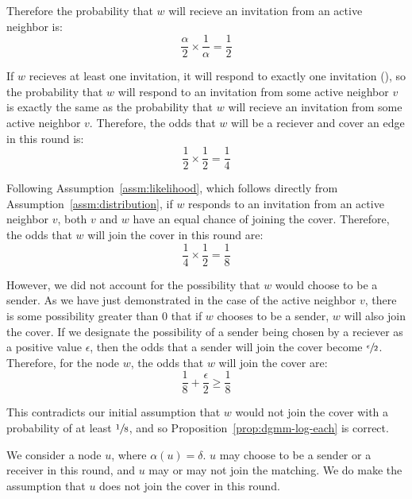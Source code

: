 \begin{IEEEproof}
\begin{IEEEproof}
Therefore the probability that $w$ will recieve an invitation from an active neighbor is: \begin{equation*}\frac{\alpha}{2} \times \frac{1}{\alpha} = \frac{1}{2}\end{equation*}

If $w$ recieves at least one invitation, it will respond to exactly one invitation (), so the probability that $w$ will respond to an invitation from some active neighbor $v$ is exactly the same as the probability that $w$ will recieve an invitation from some active neighbor $v$. Therefore, the odds that $w$ will be a reciever and cover an edge in this round is: \begin{equation*}\frac{1}{2} \times \frac{1}{2} = \frac{1}{4}\end{equation*}

Following Assumption~\ref{assm:likelihood}, which follows directly from Assumption~\ref{assm:distribution}, if $w$ responds to an invitation from an active neighbor $v$, both $v$ and $w$ have an equal chance of joining the cover. Therefore, the odds that $w$ will join the cover in this round are:\begin{equation*}\frac{1}{4} \times \frac{1}{2} = \frac{1}{8}\end{equation*}

However, we did not account for the possibility that $w$ would choose to be a sender. As we have just demonstrated in the case of the active neighbor $v$, there is some possibility greater than 0 that if $w$ chooses to be a sender, $w$ will also join the cover. If we designate the possibility of a sender being chosen by a reciever as a positive value $\epsilon$, then the odds that a sender will join the cover become $\sfrac{\epsilon}{2}$. Therefore, for the node $w$, the odds that $w$ will join the cover are:\begin{equation*}\frac{1}{8} + \frac{\epsilon}{2} \ge \frac{1}{8}\end{equation*}

This contradicts our initial assumption that $w$ would not join the cover with a probability of at least $\sfrac{1}{8}$, and so Proposition~\ref{prop:dgmm-log-each} is correct.
\end{IEEEproof}
\begin{IEEEproof}
We consider a node $u$, where $\alpha(u) = \delta$. $u$ may choose to be a sender or a receiver in this round, and $u$ may or may not join the matching. We do make the assumption that $u$ does not join the cover in this round.


\end{IEEEproof}
\end{IEEEproof}
